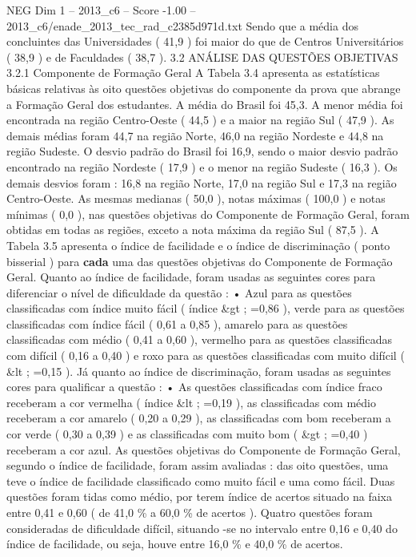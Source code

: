 \begin{textsample}{NEG Dim 1 – 2013\_c6 – Score -1.00 – 2013\_c6/enade\_2013\_tec\_rad\_c2385d971d.txt}
Sendo que a média dos concluintes das Universidades ( 41,9 ) foi maior do que de Centros Universitários ( 38,9 ) e de Faculdades ( 38,7 ). 3.2 ANÁLISE DAS QUESTÕES OBJETIVAS 3.2.1 Componente de Formação Geral A Tabela 3.4 apresenta as estatísticas básicas relativas às oito questões objetivas do componente da prova que abrange a Formação Geral dos estudantes.
A média do Brasil foi 45,3.
A menor média foi encontrada na região Centro-Oeste ( 44,5 ) e a maior na região Sul ( 47,9 ).
As demais médias foram 44,7 na região Norte, 46,0 na região Nordeste e 44,8 na região Sudeste.
O desvio padrão do Brasil foi 16,9, sendo o maior desvio padrão encontrado na região Nordeste ( 17,9 ) e o menor na região Sudeste ( 16,3 ).
Os demais desvios foram : 16,8 na região Norte, 17,0 na região Sul e 17,3 na região Centro-Oeste.
As mesmas medianas ( 50,0 ), notas máximas ( 100,0 ) e notas mínimas ( 0,0 ), nas questões objetivas do Componente de Formação Geral, foram obtidas em todas as regiões, exceto a nota máxima da região Sul ( 87,5 ).
A Tabela 3.5 apresenta o índice de facilidade e o índice de discriminação ( ponto bisserial ) para \textbf{cada} uma das questões objetivas do Componente de Formação Geral.
Quanto ao índice de facilidade, foram usadas as seguintes cores para diferenciar o nível de dificuldade da questão : • Azul para as questões classificadas com índice muito fácil ( índice \&gt ; =0,86 ), verde para as questões classificadas com índice fácil ( 0,61 a 0,85 ), amarelo para as questões classificadas com médio ( 0,41 a 0,60 ), vermelho para as questões classificadas com difícil ( 0,16 a 0,40 ) e roxo para as questões classificadas com muito difícil ( \&lt ; =0,15 ).
Já quanto ao índice de discriminação, foram usadas as seguintes cores para qualificar a questão : • As questões classificadas com índice fraco receberam a cor vermelha ( índice \&lt ; =0,19 ), as classificadas com médio receberam a cor amarelo ( 0,20 a 0,29 ), as classificadas com bom receberam a cor verde ( 0,30 a 0,39 ) e as classificadas com muito bom ( \&gt ; =0,40 ) receberam a cor azul.
As questões objetivas do Componente de Formação Geral, segundo o índice de facilidade, foram assim avaliadas : das oito questões, uma teve o índice de facilidade classificado como muito fácil e uma como fácil.
Duas questões foram tidas como médio, por terem índice de acertos situado na faixa entre 0,41 e 0,60 ( de 41,0 \% a 60,0 \% de acertos ).
Quatro questões foram consideradas de dificuldade difícil, situando -se no intervalo entre 0,16 e 0,40 do índice de facilidade, ou seja, houve entre 16,0 \% e 40,0 \% de acertos.

\end{textsample}
